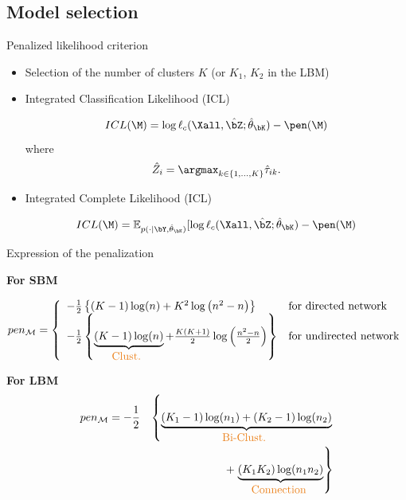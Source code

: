 \documentclass[compress,10pt]{beamer}
\begin{document}
 \subsection{Model selection}
\begin{frame}{ Penalized likelihood criterion}

 \begin{itemize}
 \item  Selection of the number of clusters  $K$ (or $K_1$, $K_2$ in the LBM)
\item   Integrated Classification Likelihood (ICL)   \textcolor{mygreen}{\cite{biernacki2000assessing}}
 

\begin{equation}\label{eq:ICL}
ICL(\M) =\log  \ell_c(\Xall,\hat{\bZ}; \hat \theta_{\bK})-  \pen(\M)
\end{equation}
 where  \begin{equation}\label{eq:Zhat}
\hat{Z}_i = \argmax_{k \in \{1, \dots, K\}}  \hat{\tau}_{ik}. 
\end{equation} 
\item   Integrated Complete Likelihood (ICL)  %

 

\begin{equation}\label{eq:ICL}
ICL(\M) =\mathbb{E}_{p(\cdot | \bY, \hat \theta_{\bK})}[\log  \ell_c(\Xall,\hat{\bZ}; \hat \theta_{\bK})-  \pen(\M)
\end{equation}
 \end{itemize}

\end{frame}


\begin{frame}{Expression of the penalization}

\textcolor{dgreen}{ \textbf{For SBM } }

$$ pen_{\mathcal{M}} = \left\{ 
\begin{array}{ll}
- \frac{1}{2}\left\{ (K-1)\log(n)  +K^2   \log \left( n^2-n \right)\right\} & \mbox{for directed network}\\
 - \frac{1}{2}\left\{ \underbrace{(K-1)\log(n) }_{\mbox{\textcolor{dgreen}{Clust. }}} + \frac{K(K+1)}{2}   \log \left(\frac{ n^2-n }{2}\right)\right\} & \mbox{for undirected network}\\
\end{array}
\right.
$$
 

\textcolor{dgreen}{ \textbf{For LBM } }
%
\begin{eqnarray*}
 pen_{\mathcal{M}} =  -  \frac{1}{2}&& \left\{  \underbrace{ (K_1-1)\log(n_1) +  (K_2-1)\log(n_2)  }_{\mbox{\textcolor{dgreen}{Bi-Clust. }}} \right. \\
& &  + \left. \underbrace{ (K_1  K_2)    \log ( n_1   n_2)} _{\mbox{\textcolor{dgreen}{Connection }}} \right\} 
 \end{eqnarray*}

\end{frame}
 
\end{document}
